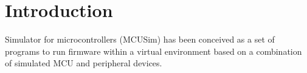 \chapter{Introduction}

Simulator for microcontrollers (MCUSim) has been conceived as a set of
programs to run firmware within a virtual environment based on a combination
of simulated MCU and peripheral devices.
